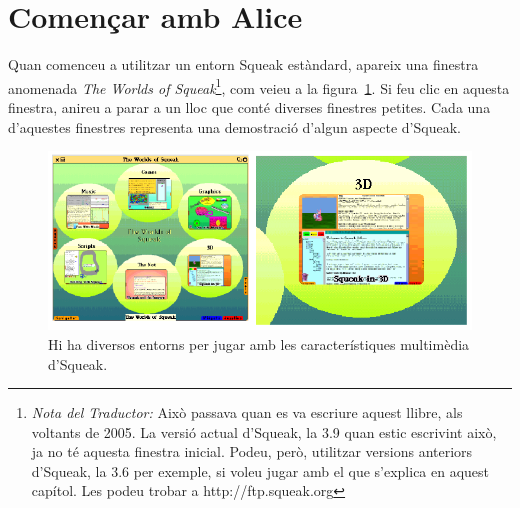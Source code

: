 \section{Començar amb Alice} 
Quan comenceu a utilitzar un entorn Squeak estàndard, apareix una finestra anomenada \emph{The Worlds of Squeak}\footnote{\emph{Nota del Traductor:} Això passava quan es va escriure aquest llibre, als voltants de 2005. La versió actual d'Squeak, la 3.9 quan estic escrivint això, ja no té aquesta finestra inicial. Podeu, però, utilitzar versions anteriors d'Squeak, la 3.6 per exemple, si voleu jugar amb el que s'explica en aquest capítol. Les podeu trobar a \textsf{http://ftp.squeak.org}}, com veieu a la figura~\ref{fig2501}. Si feu clic en aquesta finestra, anireu a parar a un lloc que conté diverses finestres petites. Cada una d'aquestes finestres representa una demostració d'algun aspecte d'Squeak. 
\begin{figure}[h!]
\begin{center}
\includegraphics[scale=2]{Imatges/figura25-1}
\end{center}
\caption{Hi ha diversos entorns per jugar amb les característiques multimèdia d'Squeak.}
\label{fig2501}
\end{figure}

